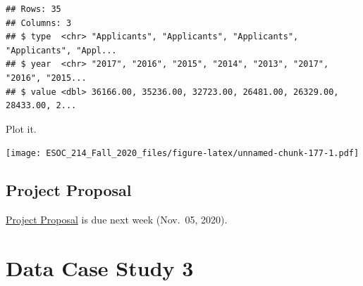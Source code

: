 \documentclass[
]{book}
\newenvironment{Shaded}{\begin{snugshade}}{\end{snugshade}}
\newcommand{\DataTypeTok}[1]{\textcolor[rgb]{0.13,0.29,0.53}{#1}}
\newcommand{\KeywordTok}[1]{\textcolor[rgb]{0.13,0.29,0.53}{\textbf{#1}}}
\newcommand{\NormalTok}[1]{#1}
\newcommand{\OperatorTok}[1]{\textcolor[rgb]{0.81,0.36,0.00}{\textbf{#1}}}
\newcommand{\OtherTok}[1]{\textcolor[rgb]{0.56,0.35,0.01}{#1}}
\newcommand{\StringTok}[1]{\textcolor[rgb]{0.31,0.60,0.02}{#1}}
\begin{document}
\begin{verbatim}
## Rows: 35
## Columns: 3
## $ type  <chr> "Applicants", "Applicants", "Applicants", "Applicants", "Appl...
## $ year  <chr> "2017", "2016", "2015", "2014", "2013", "2017", "2016", "2015...
## $ value <dbl> 36166.00, 35236.00, 32723.00, 26481.00, 26329.00, 28433.00, 2...
\end{verbatim}

Plot it.

\begin{Shaded}
\end{Shaded}

\texttt{[image: ESOC\_214\_Fall\_2020\_files/figure-latex/unnamed-chunk-177-1.pdf]}

\hypertarget{project-proposal}{%
\section{Project Proposal}\label{project-proposal}}

\href{final_project_docs/esoc214_project_proposal.pdf}{Project Proposal} is due next week (Nov.~05, 2020).

\hypertarget{data-case-study-3}{%
\chapter{Data Case Study 3}\label{data-case-study-3}}
\end{document}
